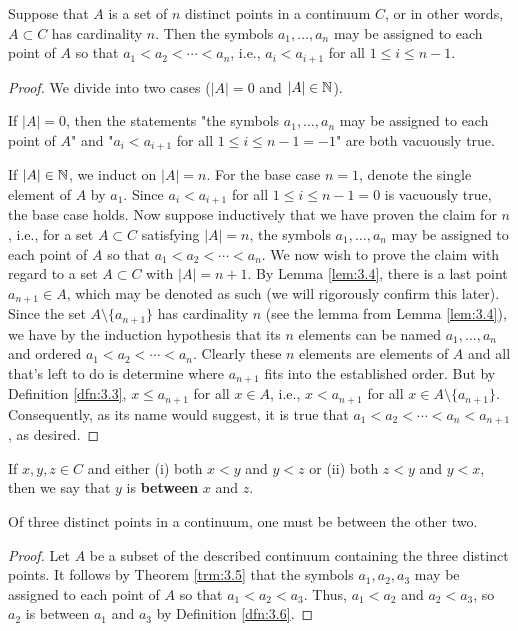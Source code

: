\documentclass[../main.tex]{subfiles}
\begin{document}
\begin{theorem}\label{trm:3.5}
    Suppose that $A$ is a set of $n$ distinct points in a continuum $C$, or in other words, $A\subset C$ has cardinality $n$. Then the symbols $a_1,\dots,a_n$ may be assigned to each point of $A$ so that $a_1<a_2<\cdots<a_n$, i.e., $a_i<a_{i+1}$ for all $1\leq i\leq n-1$.
    \begin{proof}
        We divide into two cases ($|A|=0$ and $|A|\in\mathbb{N}$).\par
        If $|A|=0$, then the statements "the symbols $a_1,\dots,a_n$ may be assigned to each point of $A$" and "$a_i<a_{i+1}$ for all $1\leq i\leq n-1=-1$" are both vacuously true.\par
        If $|A|\in\mathbb{N}$, we induct on $|A|=n$. For the base case $n=1$, denote the single element of $A$ by $a_1$. Since $a_i<a_{i+1}$ for all $1\leq i\leq n-1=0$ is vacuously true, the base case holds. Now suppose inductively that we have proven the claim for $n$, i.e., for a set $A\subset C$ satisfying $|A|=n$, the symbols $a_1,\dots,a_n$ may be assigned to each point of $A$ so that $a_1<a_2<\cdots<a_n$. We now wish to prove the claim with regard to a set $A\subset C$ with $|A|=n+1$. By Lemma \ref{lem:3.4}, there is a last point $a_{n+1}\in A$, which may be denoted as such (we will rigorously confirm this later). Since the set $A\setminus\{a_{n+1}\}$ has cardinality $n$ (see the lemma from Lemma \ref{lem:3.4}), we have by the induction hypothesis that its $n$ elements can be named $a_1,\dots,a_n$ and ordered $a_1<a_2<\cdots<a_n$. Clearly these $n$ elements are elements of $A$ and all that's left to do is determine where $a_{n+1}$ fits into the established order. But by Definition \ref{dfn:3.3}, $x\leq a_{n+1}$ for all $x\in A$, i.e., $x<a_{n+1}$ for all $x\in A\setminus\{a_{n+1}\}$. Consequently, as its name would suggest, it is true that $a_1<a_2<\cdots<a_n<a_{n+1}$, as desired.
    \end{proof}
\end{theorem}

\begin{definition}\label{dfn:3.6}
    If $x,y,z\in C$ and either (i) both $x<y$ and $y<z$ or (ii) both $z<y$ and $y<x$, then we say that $y$ is \textbf{between} $x$ and $z$.
\end{definition}

\begin{corollary}\label{cly:3.7}
    Of three distinct points in a continuum, one must be between the other two.
    \begin{proof}
        Let $A$ be a subset of the described continuum containing the three distinct points. It follows by Theorem \ref{trm:3.5} that the symbols $a_1,a_2,a_3$ may be assigned to each point of $A$ so that $a_1<a_2<a_3$. Thus, $a_1<a_2$ and $a_2<a_3$, so $a_2$ is between $a_1$ and $a_3$ by Definition \ref{dfn:3.6}.
    \end{proof}
\end{corollary}
\end{document}
